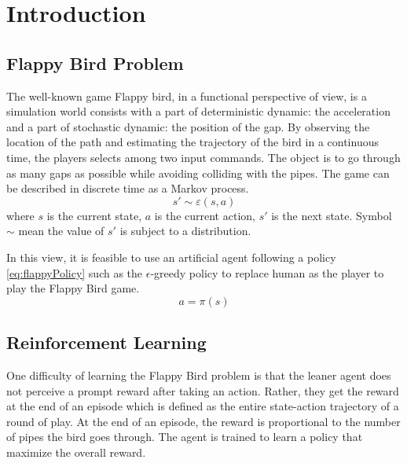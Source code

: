 \documentclass[conference,compsoc]{IEEEtran}
\begin{document}
\section{Introduction}



\subsection{Flappy Bird Problem}
The well-known game Flappy bird, in a functional perspective of view, is a simulation world consists with a part of deterministic dynamic: the acceleration and a part of stochastic dynamic: the position of the gap. By observing the location of the path and estimating the trajectory of the bird in a continuous time, the players selects among two input commands. The object is to go through as many gaps as possible while avoiding colliding with the pipes.  The game can be described in discrete time as a Markov process. 
\begin{equation}
s' \sim \varepsilon (s,a)
\end{equation}
where $s$ is the current state, $a$ is the current action, $s'$ is the next state. Symbol $\sim$ mean the value of $s'$ is subject to a distribution. 

In this view, it is feasible to use an artificial agent following a policy \eqref{eq:flappyPolicy} such as the $\epsilon$-greedy policy to replace human as the player to play the Flappy Bird game. \cite{russell1995artificial} \cite{mnih2013playing}
\begin{equation}\label{eq:flappyPolicy}
a=\pi(s)
\end{equation}

\subsection{Reinforcement Learning}
One difficulty of learning the Flappy Bird problem is that the leaner agent does not perceive a prompt reward after taking an action. Rather, they get the reward at the end of an episode which is defined as the entire state-action trajectory of a round of play. At the end of an episode, the reward is proportional to the number of pipes the bird goes through. The agent is trained to learn a policy that maximize the overall reward. 
\end{document}
